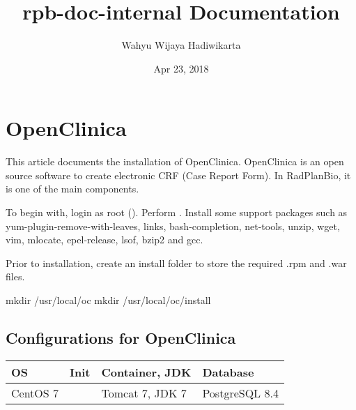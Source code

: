 \documentclass[letterpaper,10pt,english]{sphinxmanual}
\title{rpb-doc-internal Documentation}
\date{Apr 23, 2018}
\author{Wahyu Wijaya Hadiwikarta}
\begin{document}
\maketitle
\sphinxtableofcontents
{}\label{\detokenize{index::doc}}



\chapter{OpenClinica}
\label{\detokenize{trl1:welcome-to-rpb-doc-internal-s-documentation}}\label{\detokenize{trl1::doc}}\label{\detokenize{trl1:openclinica}}
This article documents the installation of OpenClinica. OpenClinica is an open source software to create electronic CRF (Case Report Form). In RadPlanBio, it is one of the main components.

To begin with, login as root (). Perform . Install some support packages such as yum-plugin-remove-with-leaves, links, bash-completion, net-tools, unzip, wget, vim, mlocate, epel-release, lsof, bzip2 and gcc.

Prior to installation, create an install folder to store the required .rpm and .war files.

%
\begin{sphinxVerbatim}[commandchars=\\\{\}]
mkdir /usr/local/oc
mkdir /usr/local/oc/install
\end{sphinxVerbatim}


\section{Configurations for OpenClinica}
\label{\detokenize{trl1:configurations-for-openclinica}}

\begin{savenotes}\sphinxattablestart
\centering
\begin{tabulary}{\linewidth}[t]{|T|T|T|T|}
\hline
\sphinxstyletheadfamily 
OS
&\sphinxstyletheadfamily 
Init
&\sphinxstyletheadfamily 
Container, JDK
&\sphinxstyletheadfamily 
Database
\\
\hline
CentOS 7
&
&
Tomcat 7, JDK 7
&
PostgreSQL 8.4
\\
\hline
\end{tabulary}
\par
\sphinxattableend\end{savenotes}
\end{document}
